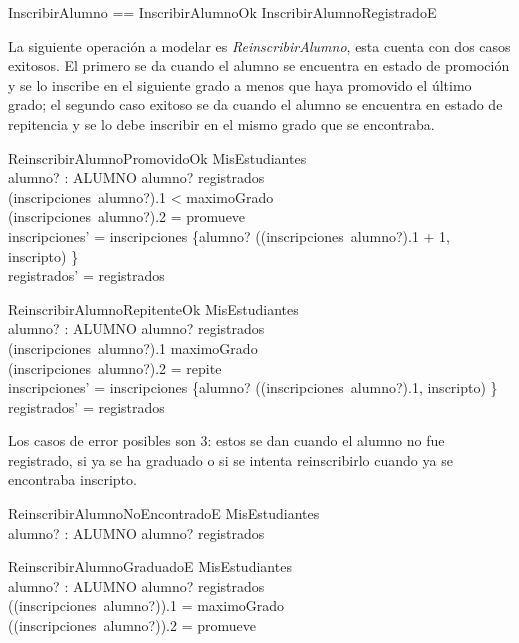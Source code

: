 \documentclass{article}
\begin{document}
\begin{zed}
    InscribirAlumno == InscribirAlumnoOk \lor InscribirAlumnoRegistradoE
\end{zed}

La siguiente operación a modelar es \emph{ReinscribirAlumno}, esta cuenta con dos casos exitosos. El primero se da cuando el alumno se encuentra en estado de promoción y se lo inscribe en el siguiente grado a menos que haya promovido el último grado; el segundo caso exitoso se da cuando el alumno se encuentra en estado de repitencia y se lo debe inscribir en el mismo grado que se encontraba.
\begin{schema}{ReinscribirAlumnoPromovidoOk}
    \Delta MisEstudiantes \\
    alumno? : ALUMNO
    \where
    alumno? \in registrados \\
    (inscripciones~alumno?).1 < maximoGrado \\ 
    (inscripciones~alumno?).2 = promueve \\
    inscripciones' = inscripciones \oplus \{alumno? \mapsto ((inscripciones~alumno?).1 + 1, inscripto) \} \\
    registrados' = registrados
\end{schema}

\begin{schema}{ReinscribirAlumnoRepitenteOk}
    \Delta MisEstudiantes \\
    alumno? : ALUMNO
    \where
    alumno? \in registrados \\
    (inscripciones~alumno?).1 \leq maximoGrado \\ 
    (inscripciones~alumno?).2 = repite \\
    inscripciones' = inscripciones \oplus \{alumno? \mapsto ((inscripciones~alumno?).1, inscripto) \} \\
    registrados' = registrados
\end{schema}

Los casos de error posibles son 3: estos se dan cuando el alumno no fue registrado, si ya se ha graduado o si se intenta reinscribirlo cuando ya se encontraba inscripto.

\begin{schema}{ReinscribirAlumnoNoEncontradoE}
    \Xi MisEstudiantes \\
    alumno? : ALUMNO
    \where
    alumno? \notin registrados
\end{schema}

\begin{schema}{ReinscribirAlumnoGraduadoE}
    \Xi MisEstudiantes \\
    alumno? : ALUMNO
    \where
    alumno? \in registrados \\
    ((inscripciones~alumno?)).1 = maximoGrado \\
    ((inscripciones~alumno?)).2 = promueve 
\end{schema}
\end{document}
